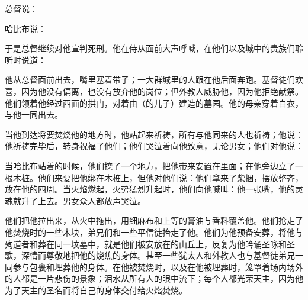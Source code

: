 总督说：\par

哈比布说：\par

于是总督继续对他宣判死刑。他在侍从面前大声呼喊，在他们以及城中的贵族们聆听时说道：\par

他从总督面前出去，嘴里塞着带子；一大群城里的人跟在他后面奔跑。基督徒们欢喜，因为他没有偏离，也没有放弃他的岗位；但外教人威胁他，因为他拒绝献祭。他们领着他经过西面的拱门，对着由（的儿子）建造的墓园。他的母亲穿着白衣，与他一同出去。\par

当他到达将要焚烧他的地方时，他站起来祈祷，所有与他同来的人也祈祷；他说：他祈祷完毕后，转身祝福了他们；他们哭泣着向他致意，无论男女；他们对他说：\par

当哈比布站着的时候，他们挖了一个地方，把他带来安置在里面；在他旁边立了一根木桩。他们来要把他绑在木桩上，但他对他们说：他们拿来了柴捆，摆放整齐，放在他的四周。当火焰燃起，火势猛烈升起时，他们向他喊叫：他一张嘴，他的灵魂就升了上去。男女众人都放声哭泣。\par

他们把他拉出来，从火中拖出，用细麻布和上等的膏油与香料覆盖他。他们抢走了他焚烧时的一些木块，弟兄们和一些平信徒抬走了他。他们为他预备安葬，将他与殉道者和葬在同一坟墓中，就是他们被安放在的山丘上，反复为他吟诵圣咏和圣歌，深情而尊敬地把他的烧焦的身体。甚至一些犹太人和外教人也与基督徒弟兄一同参与包裹和埋葬他的身体。在他被焚烧时，以及在他被埋葬时，笼罩着场内场外的人都是一片悲伤的景象；泪水从所有人的眼中流下；每个人都光荣天主，因为他为了天主的圣名而将自己的身体交付给火焰焚烧。\par

